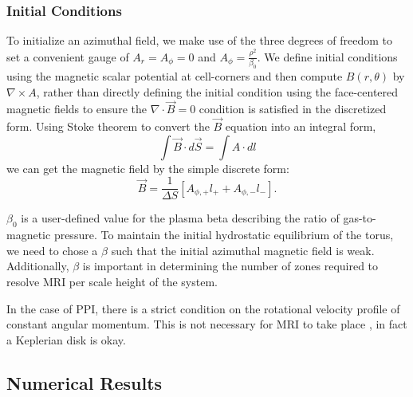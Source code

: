 \documentclass[iop,revtex4]{emulateapj}
\begin{document}
\subsubsection{Initial Conditions}
	To initialize an azimuthal field, we make use of the three degrees of freedom to set a convenient gauge of $A_r = A_\phi = 0$ and $A_\phi = \frac{\rho^2}{\beta_0}$. We define initial conditions using the magnetic scalar potential at cell-corners and then compute $B(r,\theta)$ by $\nabla \times A$, rather than directly defining the initial condition using the face-centered magnetic fields to ensure the $\nabla \cdot \vec{B}=0$ condition is satisfied in the discretized form. Using Stoke theorem to convert the $\vec{B}$ equation into an integral form,
\begin{equation}
\int \vec{B} \cdot d\vec{S}  = \int A\cdot dl 
\end{equation}
we can get the magnetic field by the simple discrete form:
\begin{equation}
\vec{B}=\frac{1}{\Delta S}[A_{\phi,+} l_+ +A_{\phi,-} l_-] .
\end{equation}
	\par $\beta_0$ is a user-defined value for the plasma beta describing the ratio of gas-to-magnetic pressure. To maintain the initial hydrostatic equilibrium of the torus, we need to chose a $\beta$ such that the initial azimuthal magnetic field is weak.
Additionally, $\beta$ is important in determining the number of zones required to resolve MRI per scale height of the system.
\par In the case of \ac{PPI}, there is a strict condition on the rotational velocity profile of constant angular momentum. This is not necessary for \ac{MRI} to take place , in fact a Keplerian disk is okay. 
\subsection{Numerical Results}
\end{document}

